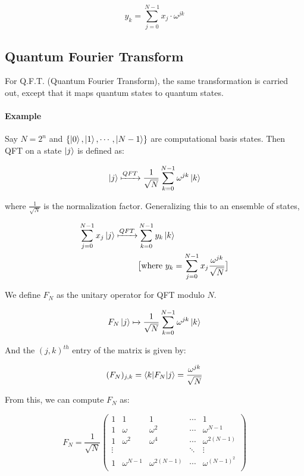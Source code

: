 \documentclass[11.5pt, paper=a4]{article}
\theoremstyle{definition}
\numberwithin{theorem}{section}
\begin{document}
\begin{equation}
    y_k = \sum_{j=0}^{N-1} x_j \cdot \omega^{jk}
\end{equation}

\subsection{Quantum Fourier Transform}

For Q.F.T. (Quantum Fourier Transform), the same transformation is carried out, except that it maps
quantum states to quantum states.

\paragraph{Example}
Say $N = 2^n$ and $\{ \ket{0}, \ket{1}, \cdots, \ket{N-1} \}$ are computational basis states. Then
QFT on a state $\ket{j}$ is defined as:

\[
    \ket{j} \xmapsto{QFT} \displaystyle \frac{1}{\sqrt{N}} \sum_{k=0}^{N-1} \omega^{jk} \ket{k}
\]

where $\displaystyle \frac{1}{\sqrt{N}}$ is the normalization factor. Generalizing this to an ensemble of states,

\begin{align}
    \sum_{j=0}^{N-1} x_j\ket{j} \xmapsto{QFT} & \sum_{k=0}^{N-1} y_k \ket{k}                   \\
                                              & \big[ \text{where } y_k = \sum_{j=0}^{N-1} x_j
        \frac{\omega^{jk}}{\sqrt{N}} \big] \nonumber
\end{align}


We define $F_N$ as the unitary operator for QFT modulo $N$.

\[
    F_N\ket{j} \xmapsto{} \displaystyle \frac{1}{\sqrt{N}} \sum_{k=0}^{N-1} \omega^{jk} \ket{k}
\]

And the $(j, k)^{th}$ entry of the matrix is given by:

\[
    (F_N)_{j,k} = \braket{k|F_N|j} = \displaystyle \frac{\omega^{jk}}{\sqrt{N}}
\]

From this, we can compute $F_N$ as:

\[
    F_N = \displaystyle \frac{1}{\sqrt{N}} \begin{pmatrix}
        1      & 1            & 1               & \cdots & 1                \\
        1      & \omega       & \omega^2        & \cdots & \omega^{N-1}     \\
        1      & \omega^2     & \omega^4        & \cdots & \omega^{2(N-1)}  \\
        \vdots &              &                 & \ddots & \vdots           \\
        1      & \omega^{N-1} & \omega^{2(N-1)} & \cdots & \omega^{(N-1)^2} \\
    \end{pmatrix}
\]
\end{document}
